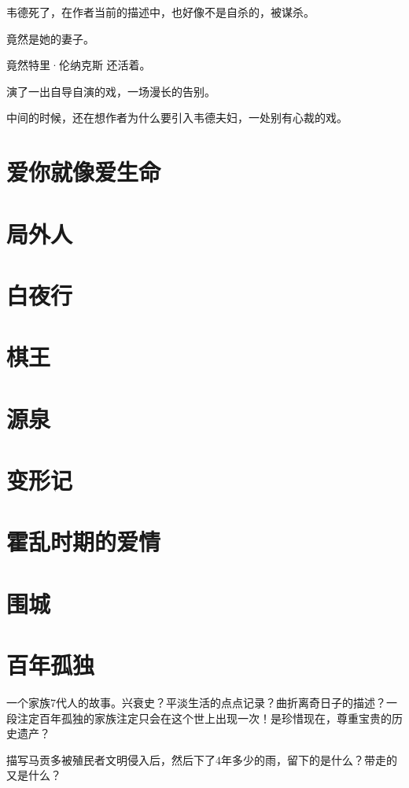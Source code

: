 \documentclass[UTF8,a4paper,12pt]{ctexbook}
\begin{document}
		韦德死了，在作者当前的描述中，也好像不是自杀的，被谋杀。
		
		竟然是她的妻子。
		
		竟然特里·伦纳克斯 还活着。
		
		演了一出自导自演的戏，一场漫长的告别。
		
		中间的时候，还在想作者为什么要引入韦德夫妇，一处别有心裁的戏。
		
	\section{爱你就像爱生命}
		
	\section{局外人}
	
	\section{白夜行}
	
	\section{棋王}
	
	\section{源泉}
	
	\section{变形记}
	
	\section{霍乱时期的爱情}
	
	\section{围城}
	
	\section{百年孤独}
		一个家族7代人的故事。兴衰史？平淡生活的点点记录？曲折离奇日子的描述？一段注定百年孤独的家族注定只会在这个世上出现一次！是珍惜现在，尊重宝贵的历史遗产？
		
		描写马贡多被殖民者文明侵入后，然后下了4年多少的雨，留下的是什么？带走的又是什么？
		
\end{document}

